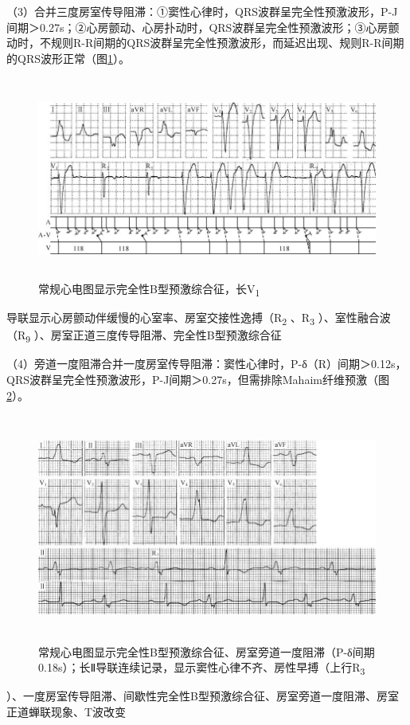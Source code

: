 （3）合并三度房室传导阻滞：①窦性心律时，QRS波群呈完全性预激波形，P-J间期＞0.27s；②心房颤动、心房扑动时，QRS波群呈完全性预激波形；③心房颤动时，不规则R-R间期的QRS波群呈完全性预激波形，而延迟出现、规则R-R间期的QRS波形正常（图\ref{fig36-19}）。

\begin{figure}[!htbp]
 \centering
 \includegraphics[width=5.78125in,height=2.61458in]{./images/Image00591.jpg}
 \captionsetup{justification=centering}
 \caption{常规心电图显示完全性B型预激综合征，长V\textsubscript{1}}
 \label{fig36-19}
  \end{figure} 
导联显示心房颤动伴缓慢的心室率、房室交接性逸搏（R\textsubscript{2}
、R\textsubscript{3} ）、室性融合波（R\textsubscript{9}
）、房室正道三度传导阻滞、完全性B型预激综合征

（4）旁道一度阻滞合并一度房室传导阻滞：窦性心律时，P-δ（R）间期＞0.12s，QRS波群呈完全性预激波形，P-J间期＞0.27s，但需排除Mahaim纤维预激（图\ref{fig36-20}）。

\begin{figure}[!htbp]
 \centering
 \includegraphics[width=5.76042in,height=2.95833in]{./images/Image00592.jpg}
 \captionsetup{justification=centering}
 \caption{常规心电图显示完全性B型预激综合征、房室旁道一度阻滞（P-δ间期0.18s）；长Ⅱ导联连续记录，显示窦性心律不齐、房性早搏（上行R\textsubscript{3}}
 \label{fig36-20}
  \end{figure} 
）、一度房室传导阻滞、间歇性完全性B型预激综合征、房室旁道一度阻滞、房室正道蝉联现象、T波改变

